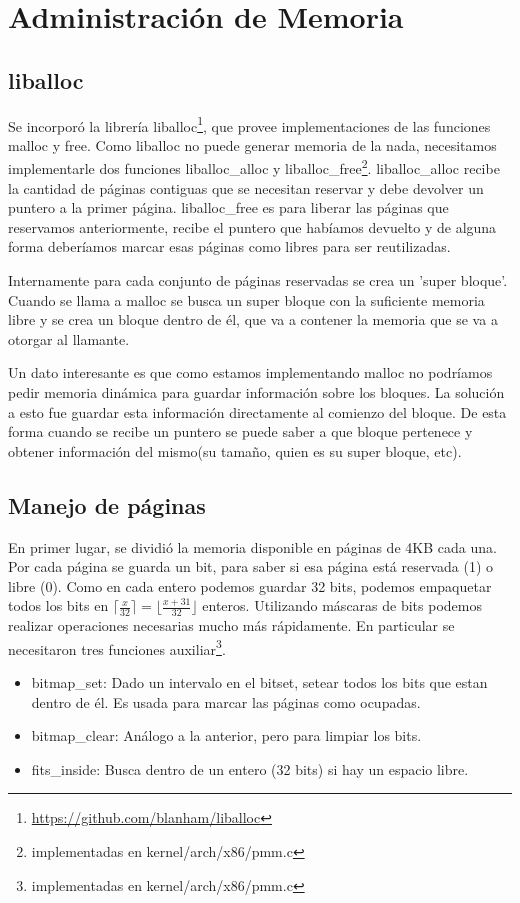\section{Administración de Memoria}\label{sec:memory}
\subsection{liballoc}
Se incorporó la librería liballoc\footnote{\url{https://github.com/blanham/liballoc}}, que provee implementaciones de las funciones malloc y free. Como liballoc no puede generar memoria de la nada, necesitamos implementarle dos funciones liballoc\_alloc y liballoc\_free\footnote{implementadas en kernel/arch/x86/pmm.c}. liballoc\_alloc recibe la cantidad de páginas contiguas que se necesitan reservar y debe devolver un puntero a la primer página. liballoc\_free es para liberar las páginas que reservamos anteriormente, recibe el puntero que habíamos devuelto y de alguna forma deberíamos marcar esas páginas como libres para ser reutilizadas.

Internamente para cada conjunto de páginas reservadas se crea un 'super bloque'. Cuando se llama a malloc se busca un super bloque con la suficiente memoria libre y se crea un bloque dentro de él, que va a contener la memoria que se va a otorgar al llamante.

Un dato interesante es que como estamos implementando malloc no podríamos pedir memoria dinámica para guardar información sobre los bloques. La solución a esto fue guardar esta información directamente al comienzo del bloque. De esta forma cuando se recibe un puntero se puede saber a que bloque pertenece y obtener información del mismo(su tamaño, quien es su super bloque, etc).

\subsection{Manejo de páginas}
En primer lugar, se dividió la memoria disponible en páginas de 4KB cada una. Por cada página se guarda un bit, para saber si esa página está reservada (1) o libre (0). Como en cada entero podemos guardar 32 bits, podemos empaquetar todos los bits en $\lceil\frac{x}{32}\rceil=\lfloor\frac{x+31}{32}\rfloor$ enteros. Utilizando máscaras de bits podemos realizar operaciones necesarias mucho más rápidamente. En particular se necesitaron tres funciones auxiliar\footnote{implementadas en kernel/arch/x86/pmm.c}.

\begin{itemize}
\item bitmap\_set: Dado un intervalo en el bitset, setear todos los bits que estan dentro de él. Es usada para marcar las páginas como ocupadas.
\item bitmap\_clear: Análogo a la anterior, pero para limpiar los bits.
\item fits_inside: Busca dentro de un entero (32 bits) si hay un espacio libre. 
\end{itemize}

